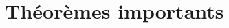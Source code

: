 \documentclass[12pt,a4paper]{article}
\begin{document}
\maketitle
\tableofcontents
\newpage


\newpage


\section{Théorèmes importants}




\end{document}
